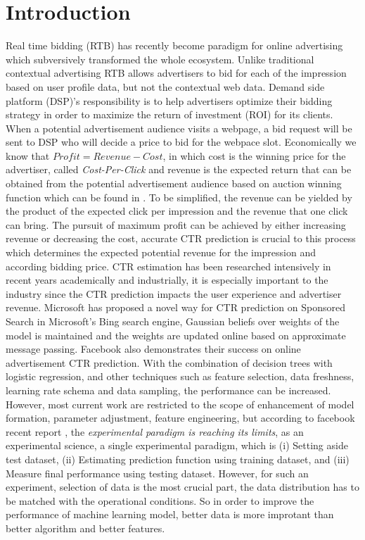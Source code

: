 \documentclass{sig-alternate}
\begin{document}

\section{Introduction}
Real time bidding (RTB) has recently become paradigm for online advertising which subversively transformed the whole ecosystem. Unlike traditional contextual advertising
RTB allows advertisers to bid for each of the impression based on user profile data, but not the contextual web data. Demand side platform (DSP)'s responsibility is to help advertisers optimize their bidding strategy in order to maximize the return of investment (ROI) for its clients. When a potential advertisement audience visits a webpage, a bid request will be sent to DSP who will decide a price to bid for the webpace slot. Economically we know that \(Profit = Revenue - Cost\), in which cost is the winning price for the advertiser, called \textit{Cost-Per-Click} and revenue is the expected return that can be obtained from the potential advertisement audience based on auction winning function which can be found in \cite{zhang2014optimal}. To be simplified, the revenue can be yielded by the product of the expected click per impression and the revenue that one click can bring. The pursuit of maximum profit can be achieved by either increasing revenue or decreasing the cost, accurate CTR prediction is crucial to this process which determines the expected potential revenue for the impression and according bidding price. 
CTR estimation has been researched intensively in recent years academically and industrially, it is especially important to the industry since the CTR prediction impacts the user experience and advertiser revenue. Microsoft \cite{graepel2010web}has proposed a novel way for CTR prediction on Sponsored Search in Microsoft’s Bing search engine, Gaussian beliefs over weights of the model is maintained and the weights are updated online based on approximate message passing. Facebook \cite{he2014practical} also demonstrates their success on online advertisement CTR prediction. With the combination of decision trees with logistic regression, and other techniques such as feature selection, data freshness, learning rate schema and data sampling, the performance can be increased. However, most current work are restricted to the scope of enhancement of model formation, parameter adjustment, feature engineering, but according to facebook recent report \cite{facebook2015}, the \textit{experimental paradigm is reaching its limits}, as an experimental science, a single experimental paradigm, which is (i) Setting aside test dataset, (ii) Estimating prediction function using training dataset, and (iii) Measure final performance using testing dataset. However, for such an experiment, selection of data is the most crucial part, the data distribution has to be matched with the operational conditions. So in order to improve the performance of machine learning model, better data is more improtant than better algorithm and better features.
\end{document}
